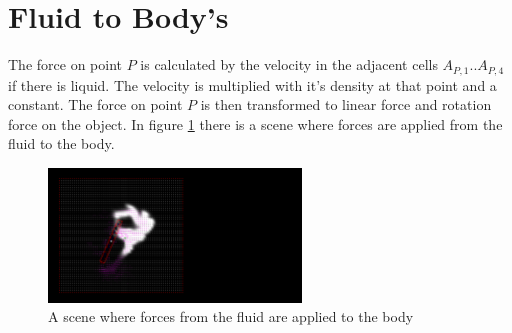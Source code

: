 \section{Fluid to Body's}
The force on point $P$ is calculated by the velocity in the adjacent cells $A_{P,1} .. A_{P,4}$ if there is liquid. The velocity is multiplied with it's density at that point and a constant. The force on point $P$ is then transformed to linear force and rotation force on the object. In figure \ref{fig:FluidToBody} there is a scene where forces are applied from the fluid to the body.

\begin{figure}[htb!]
    \centering
    \includegraphics[width=0.6\textwidth]{images/FluidToBody}
    \caption{A scene where forces from the fluid are applied to the body}
    \label{fig:FluidToBody}
\end{figure}